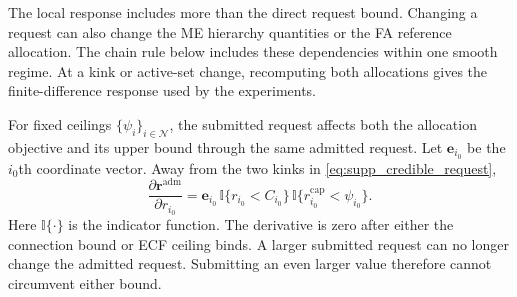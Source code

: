 \documentclass[11pt]{article}
\newcommand{\indicator}{\mathbb{I}}
\begin{document}
The local response includes more than the direct request bound. Changing a
request can also change the ME hierarchy quantities or the FA reference
allocation. The chain rule below includes these dependencies within one smooth
regime. At a kink or active-set change, recomputing both allocations gives the
finite-difference response used by the experiments.

For fixed ceilings $\{\psi_i\}_{i\in\mathcal N}$, the submitted request affects
both the allocation objective and its upper bound through the same admitted
request. Let $\mathbf{e}_{i_0}$ be the $i_0$th coordinate vector. Away from the two
kinks in \eqref{eq:supp_credible_request},
\begin{equation}
\frac{\partial\mathbf r^{\mathrm{adm}}}{\partial r_{i_0}}
=\mathbf{e}_{i_0}\,
\indicator\{r_{i_0}<C_{i_0}\}\,
\indicator\{r_{i_0}^{\mathrm{cap}}<\psi_{i_0}\}.
\label{eq:supp_filtered_request_derivative}
\end{equation}
Here $\indicator\{\cdot\}$ is the indicator function. The derivative is zero
after either the connection bound or ECF ceiling binds. A larger submitted
request can no longer change the admitted request. Submitting an even larger
value therefore cannot circumvent either bound.
\end{document}
